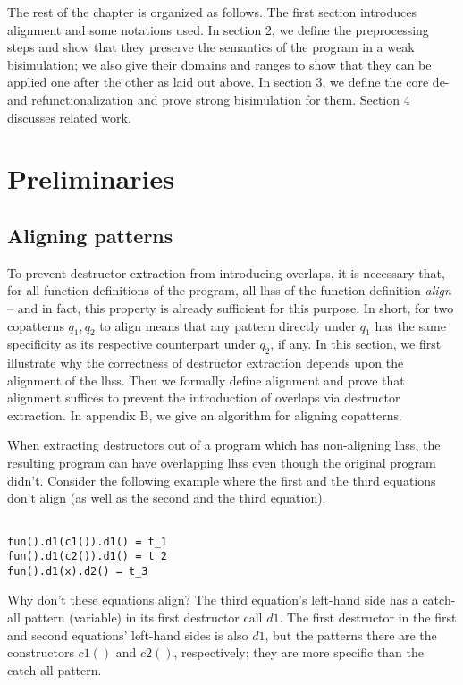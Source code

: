 The rest of the chapter is organized as follows. The first section introduces alignment and some notations used. In section 2, we define the preprocessing steps and show that they preserve the semantics of the program in a weak bisimulation; we also give their domains and ranges to show that they can be applied one after the other as laid out above. In section 3, we define the core de- and refunctionalization and prove strong bisimulation for them. Section 4 discusses related work.

\section{Preliminaries}

\subsection{Aligning patterns}

To prevent destructor extraction from introducing overlaps, it is necessary that, for all function definitions of the program, all lhss of the function definition \textit{align} -- and in fact, this property is already sufficient for this purpose. In short, for two copatterns $q_1, q_2$ to align means that any pattern directly under $q_1$ has the same specificity as its respective counterpart under $q_2$, if any. In this section, we first illustrate why the correctness of destructor extraction depends upon the alignment of the lhss. Then we formally define alignment and prove that alignment suffices to prevent the introduction of overlaps via destructor extraction. In appendix B, we give an algorithm for aligning copatterns.

When extracting destructors out of a program which has non-aligning lhss, the resulting program can have overlapping lhss even though the original program didn't. Consider the following example where the first and the third equations don't align (as well as the second and the third equation).

\begin{lstlisting}

fun().d1(c1()).d1() = t_1
fun().d1(c2()).d1() = t_2
fun().d1(x).d2() = t_3

\end{lstlisting}

Why don't these equations align? The third equation's left-hand side has a catch-all pattern (variable) in its first destructor call $d1$. The first destructor in the first and second equations' left-hand sides is also $d1$, but the patterns there are the constructors $c1()$ and $c2()$, respectively; they are more specific than the catch-all pattern.


